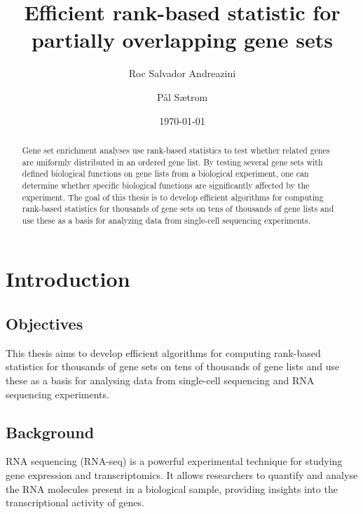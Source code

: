 \documentclass[aps,prb,twocolumn,superscriptaddress,floatfix,longbibliography]{revtex4-2}
\newif\ifptitle
\newif\ifpnumber
\newcounter{para}
\newcommand\ptitle[1]{\par\refstepcounter{para}
{\ifpnumber{\noindent\textcolor{lightgray}{\textbf{\thepara}}\indent}\fi}
{\ifptitle{\textbf{[{#1}]}}\fi}}
\newcommand{\mytitle}{Efficient rank-based statistic for partially overlapping gene sets}
\begin{document}
\title{\mytitle}

\author{Roc Salvador Andreazini}
\author{Pål Sætrom}


\date{\today}

\begin{abstract}
Gene set enrichment analyses use rank-based statistics to test whether related genes are uniformly distributed in an ordered gene list. By testing several gene sets with defined biological functions on gene lists from a biological experiment, one can determine whether specific biological functions are significantly affected by the experiment. The goal of this thesis is to develop efficient algorithms for computing rank-based statistics for thousands of gene sets on tens of thousands of gene lists and use these as a basis for analyzing data from single-cell sequencing experiments.
\end{abstract}

\maketitle
\section{\label{sec:Start}Introduction}

\subsection{Objectives}

This thesis aims to develop efficient algorithms for computing rank-based statistics for thousands of gene sets on tens of thousands of gene lists and use these as a basis for analysing data from single-cell sequencing and RNA sequencing experiments.

\subsection{Background}

\ptitle{RNA sequencing}

RNA sequencing (RNA-seq) is a powerful experimental technique for studying gene expression and transcriptomics. It allows researchers to quantify and analyse the RNA molecules present in a biological sample, providing insights into the transcriptional activity of genes.
\end{document}
